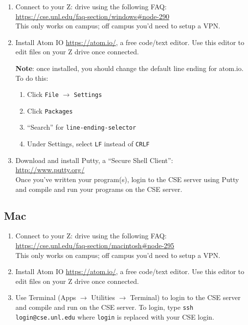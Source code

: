 \documentclass[12pt]{scrartcl}
\begin{document}
\begin{enumerate} 
  \item Connect to your Z: drive using the following FAQ: \\
  \url{https://cse.unl.edu/faq-section/windows#node-290}\\
  This only works on campus; off campus you'd need to setup a VPN.
  \item Install Atom IO \url{https://atom.io/}, a free code/text 
  editor.  Use this editor to edit files on your Z drive once connected.
  
  \textbf{Note}: once installed, you should change the default line ending
  for atom.io.  To do this:
  \begin{enumerate}
    \item Click \texttt{File} $\rightarrow$ \texttt{Settings}
    \item Click \texttt{Packages}
    \item ``Search'' for \texttt{line-ending-selector}
    \item Under Settings, select \texttt{LF} instead of \texttt{CRLF}
  \end{enumerate}
  
  \item Download and install Putty, a ``Secure Shell Client'': \\
  \url{http://www.putty.org/}\\
  Once you've written your program(s), login to the CSE server
  using Putty and compile and run your programs on the CSE server.
\end{enumerate}

\subsection*{Mac}

\begin{enumerate}
  \item Connect to your Z: drive using the following FAQ: \\
  \url{https://cse.unl.edu/faq-section/macintosh#node-295}\\
  This only works on campus; off campus you'd need to setup a VPN.
  \item Install Atom IO \url{https://atom.io/}, a free code/text 
  editor.  Use this editor to edit files on your Z drive once connected.
  \item Use Terminal (Apps $\rightarrow$ Utilities $\rightarrow$ Terminal) to
  login to the CSE server and compile and run on the CSE server.  To login, type
  \texttt{ssh login@cse.unl.edu} where \texttt{login} 
  is replaced with your CSE login.
\end{enumerate}
  
\end{document}
